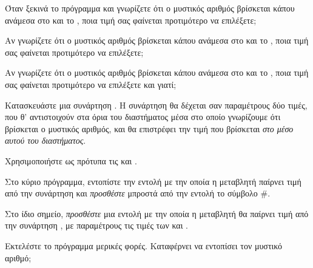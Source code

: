 \documentclass[a4paper,11pt,oneside]{book}
\begin{document}
\begin{step}
Όταν ξεκινά το πρόγραμμα και γνωρίζετε ότι ο μυστικός αριθμός βρίσκεται κάπου ανάμεσα στο  και το , ποια τιμή σας φαίνεται προτιμότερο να επιλέξετε;

\marginnote[14pt]{\icondiscuss}

\dottedline

Αν γνωρίζετε ότι ο μυστικός αριθμός βρίσκεται κάπου ανάμεσα στο  και το , ποια τιμή σας φαίνεται προτιμότερο να επιλέξετε;

\marginnote[14pt]{\icondiscuss}
\dottedline

Αν γνωρίζετε ότι ο μυστικός αριθμός βρίσκεται κάπου ανάμεσα στο  και το , ποια τιμή σας φαίνεται προτιμότερο να επιλέξετε και γιατί;

\marginnote[14pt]{\icondiscuss}
\dottedline

\dottedline

\end{step}

\begin{step}
Κατασκευάστε μια συνάρτηση . Η συνάρτηση θα δέχεται σαν παραμέτρους δύο τιμές, που θ' αντιστοιχούν στα όρια του διαστήματος μέσα στο οποίο γνωρίζουμε ότι βρίσκεται ο μυστικός αριθμός, και θα επιστρέφει την τιμή που βρίσκεται%
\emph{στο μέσο αυτού του διαστήματος}.

\begin{note}
Χρησιμοποιήστε ως πρότυπα τις  και .
\end{note}

Στο κύριο πρόγραμμα, εντοπίστε την εντολή με την οποία η μεταβλητή  παίρνει τιμή από την συνάρτηση  και \emph{προσθέστε} μπροστά από την εντολή το σύμβολο \#.

Στο ίδιο σημείο, \emph{προσθέστε} μια εντολή με την οποία η μεταβλητή  θα παίρνει τιμή από την συνάρτηση , με παραμέτρους τις τιμές των  και .
\end{step}

Εκτελέστε το πρόγραμμα μερικές φορές. Καταφέρνει να εντοπίσει τον μυστικό αριθμό;
\end{document}

